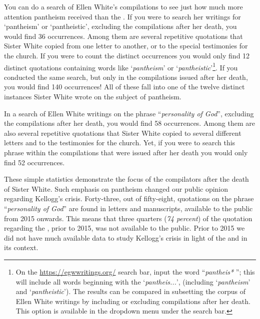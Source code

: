 You can do a search of Ellen White’s compilations to see just how much more attention pantheism received than the . If you were to search her writings for ‘pantheism’ or ‘pantheistic’, excluding the compilations after her death, you would find 36 occurrences. Among them are several repetitive quotations that Sister White copied from one letter to another, or to the special testimonies for the church. If you were to count the distinct occurrences you would only find 12 distinct quotations containing words like ‘\textit{pantheism}’ or ‘\textit{pantheistic}’\footnote{On the \href{https://egwwritings.org/}{https://egwwritings.org/} search bar, input the word “\textit{pantheis*} ”; this will include all words beginning with the ‘\textit{pantheis...}’, (including ‘\textit{pantheism}’ and ‘\textit{pantheistic}’). The results can be compared in subsetting the corpus of Ellen White writings by including or excluding compilations after her death. This option is available in the dropdown menu under the search bar.}. If you conducted the same search, but only in the compilations issued after her death, you would find 140 occurrences! All of these fall into one of the twelve distinct instances Sister White wrote on the subject of pantheism.

In a search of Ellen White writings on the phrase “\textit{personality of God}”, excluding the compilations after her death, you would find 58 occurrences. Among them are also several repetitive quotations that Sister White copied to several different letters and to the testimonies for the church. Yet, if you were to search this phrase within the compilations that were issued after her death you would only find 52 occurrences.

These simple statistics demonstrate the focus of the compilators after the death of Sister White. Such emphasis on pantheism changed our public opinion regarding Kellogg’s crisis. Forty-three, out of fifty-eight, quotations on the phrase “\textit{personality of God}” are found in letters and manuscripts, available to the public from 2015 onwards. This means that three quarters (\textit{74 percent}) of the quotation regarding the , prior to 2015, was not available to the public. Prior to 2015 we did not have much available data to study Kellogg's crisis in light of the  and in its context.

